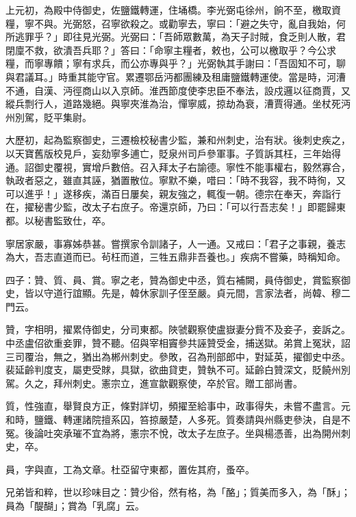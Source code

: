 \begin{pinyinscope}
 上元初，為殿中侍御史，佐鹽鐵轉運，住埇橋。李光弼屯徐州，餉不至，檄取資糧，寧不與。光弼怒，召寧欲殺之。或勸寧去，寧曰：「避之失守，亂自我始，何所逃罪乎？」即往見光弼。光弼曰：「吾師眾數萬，為天子討賊，食乏則人散，君閉廩不救，欲潰吾兵耶？」答曰：「命寧主糧者，敕也，公可以檄取乎？今公求糧，而寧專饋；寧有求兵，而公亦專與乎？」光弼執其手謝曰：「吾固知不可，聊與君議耳。」時重其能守官。累遷鄂岳沔都團練及租庸鹽鐵轉運使。當是時，河漕不通，自漢、沔徑商山以入京師。淮西節度使李忠臣不奉法，設戍邏以征商賈，又縱兵剽行人，道路幾絕。與寧夾淮為治，憚寧威，掠劫為衰，漕賈得通。坐杖死沔州別駕，貶平集尉。



 大歷初，起為監察御史，三遷檢校秘書少監，兼和州刺史，治有狀。後刺史疾之，以天寶舊版校見戶，妄劾寧多逋亡，貶泉州司戶參軍事。子質訴其枉，三年始得通。詔御史覆視，實增戶數倍。召入拜太子右諭德。寧性不能事權右，毅然寡合，執政者惡之，雖直其誣，猶置散位。寧默不樂，唶曰：「時不我容，我不時徇，又可以進乎！」遂移疾，滿百日屢矣，親友強之，輒復一朝。德宗在奉天，奔詣行在，擢秘書少監，改太子右庶子。帝還京師，乃曰：「可以行吾志矣！」即罷歸東都。以秘書監致仕，卒。



 寧居家嚴，事寡姊恭甚。嘗撰家令訓諸子，人一通。又戒曰：「君子之事親，養志為大，吾志直道而已。茍枉而道，三牲五鼎非吾養也。」疾病不嘗藥，時稱知命。



 四子：贊、質、員、賞。寧之老，贊為御史中丞，質右補闕，員侍御史，賞監察御史，皆以守道行誼顯。先是，韓休家訓子侄至嚴。貞元間，言家法者，尚韓、穆二門云。



 贊，字相明，擢累侍御史，分司東都。陜虢觀察使盧嶽妻分貲不及妾子，妾訴之。中丞盧佋欲重妾罪，贊不聽。佋與宰相竇參共誣贊受金，捕送獄。弟賞上冤狀，詔三司覆治，無之，猶出為郴州刺史。參敗，召為刑部郎中，對延英，擢御史中丞。裴延齡判度支，屬吏受賕，具獄，欲曲貸吏，贊執不可。延齡白贊深文，貶饒州別駕。久之，拜州刺史。憲宗立，進宣歙觀察使，卒於官。贈工部尚書。



 質，性強直，舉賢良方正，條對詳切，頻擢至給事中，政事得失，未嘗不盡言。元和時，鹽鐵、轉運諸院擅系囚，笞掠嚴楚，人多死。質奏請與州縣吏參決，自是不冤。後論吐突承璀不宜為將，憲宗不悅，改太子左庶子。坐與楊憑善，出為開州刺史，卒。



 員，字與直，工為文章。杜亞留守東都，置佐其府，蚤卒。



 兄弟皆和粹，世以珍味目之：贊少俗，然有格，為「酪」；質美而多入，為「酥」；員為「醍醐」；賞為「乳腐」云。




\end{pinyinscope}
